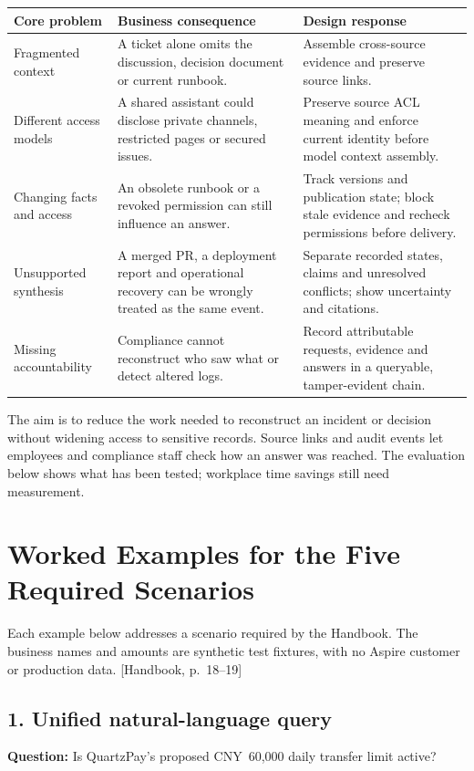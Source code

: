 \documentclass[10pt,a4paper]{article}
\newcommand{\hb}[1]{{\footnotesize\textcolor{Muted}{[Handbook, p.~#1]}}}
\begin{document}
\begin{tabularx}{\linewidth}{@{}>{\raggedright\arraybackslash}p{35mm}YY@{}}
\toprule
\textbf{Core problem} & \textbf{Business consequence} & \textbf{Design response} \\
\midrule
Fragmented context & A ticket alone omits the discussion, decision document or current runbook. & Assemble cross-source evidence and preserve source links. \\
Different access models & A shared assistant could disclose private channels, restricted pages or secured issues. & Preserve source ACL meaning and enforce current identity before model context assembly. \\
Changing facts and access & An obsolete runbook or a revoked permission can still influence an answer. & Track versions and publication state; block stale evidence and recheck permissions before delivery. \\
Unsupported synthesis & A merged PR, a deployment report and operational recovery can be wrongly treated as the same event. & Separate recorded states, claims and unresolved conflicts; show uncertainty and citations. \\
Missing accountability & Compliance cannot reconstruct who saw what or detect altered logs. & Record attributable requests, evidence and answers in a queryable, tamper-evident chain. \\
\bottomrule
\end{tabularx}

The aim is to reduce the work needed to reconstruct an incident or decision without widening access to sensitive records. Source links and audit events let employees and compliance staff check how an answer was reached. The evaluation below shows what has been tested; workplace time savings still need measurement.

\clearpage
\section{Worked Examples for the Five Required Scenarios}
Each example below addresses a scenario required by the Handbook. The business names and amounts are synthetic test fixtures, with no Aspire customer or production data. \hb{18--19}

\subsection{1. Unified natural-language query}
\textbf{Question:} Is QuartzPay's proposed CNY~60,000 daily transfer limit active?
\end{document}
